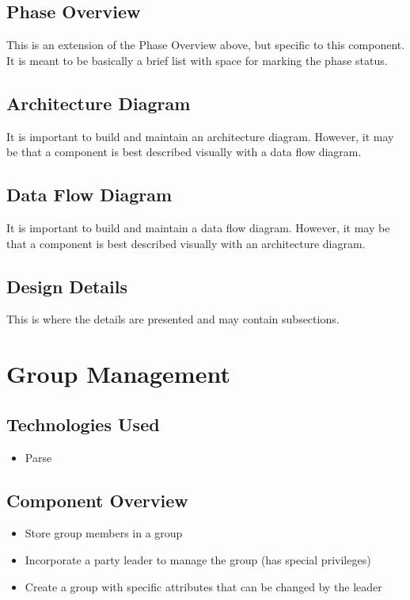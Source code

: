 \subsection{Phase Overview}
This is an extension of the Phase Overview above, but specific to this component. 
 It is meant to be basically a brief list with space for marking the phase status. 

\subsection{ Architecture  Diagram}
It is important to build and maintain an architecture diagram.  However, it may 
be that a component is best described visually with a data flow diagram. 

\subsection{Data Flow Diagram}
It is important to build and maintain a data flow diagram.  However, it may be 
that a component is best described visually with an architecture diagram. 


\subsection{Design Details}
This is where the details are presented and may contain subsections. 

\section{Group Management }

\subsection{Technologies  Used}
\begin{itemize}
  \item Parse
\end{itemize}

\subsection{Component  Overview}
\begin{itemize}
  \item Store group members in a group
  \item Incorporate a party leader to manage the group (has special privileges)
  \item Create a group with specific attributes that can be changed by the leader
\end{itemize}

